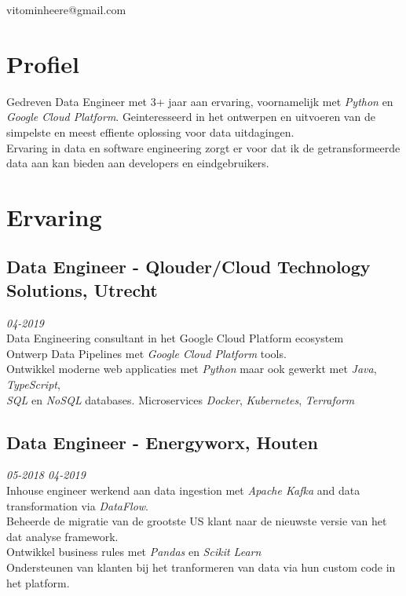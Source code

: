 \documentclass{article}
\makeatletter
\renewcommand{\maketitle}{
\begin{center}
	{\huge\bfseries
	\theauthor}

\vspace*{1cm}
vitominheere@gmail.com

\end{center}
}
\makeatother
\begin{document}
\author{Vito Minheere}


\maketitle

\section{\sc Profiel}
Gedreven Data Engineer met 3+ jaar aan ervaring, voornamelijk met \emph{Python} en \emph{Google Cloud Platform}. Geinteresseerd in het ontwerpen en uitvoeren van de simpelste en meest effiente oplossing voor data uitdagingen. \\
Ervaring in data en software engineering zorgt er voor dat ik de getransformeerde data aan kan bieden aan developers en eindgebruikers.

\section{\sc Ervaring}
\subsection{Data Engineer - Qlouder/Cloud Technology Solutions, Utrecht} \hfill {\em 04-2019} \\
Data Engineering consultant in het Google Cloud Platform ecosystem \\
Ontwerp Data Pipelines met \emph{Google Cloud Platform} tools. \\
Ontwikkel moderne web applicaties met \emph{Python} maar ook gewerkt met \emph{Java}, \emph{TypeScript}, \\ 
\emph{SQL} en \emph{NoSQL} databases. 
Microservices  \emph{Docker}, \emph{Kubernetes}, \emph{Terraform} \\

\subsection{Data Engineer - Energyworx, Houten} \hfill {\em 05-2018 04-2019} \\
Inhouse engineer werkend aan data ingestion met \emph{Apache Kafka} and data transformation via \emph{DataFlow}. \\
Beheerde de migratie van de grootste US klant naar de nieuwste versie van het dat analyse framework. \\
Ontwikkel business rules met \emph{Pandas} en \emph{Scikit Learn} \\ 
Ondersteunen van klanten bij het tranformeren van data via hun custom code in het platform. \\
\end{document}

